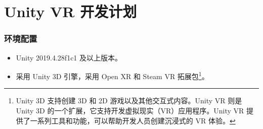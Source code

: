 \documentclass[letterpaper,10pt]{article}
\begin{document}
%				
%				
%				
%				
%				
%				
	
	\part{Unity VR 开发计划}
	
		\section{环境配置}

		\begin{itemize}
			\item [(1)] 
			Unity 2019.4.28f1c1 及以上版本。
			
			\item [(2)]
			采用 Unity 3D 引擎，采用 Open XR 和 Steam VR 拓展包\footnote{Unity 3D 支持创建 3D 和 2D 游戏以及其他交互式内容。Unity VR 则是 Unity 3D 的一个扩展，它支持开发虚拟现实（VR）应用程序。Unity VR 提供了一系列工具和功能，可以帮助开发人员创建沉浸式的 VR 体验。}。
		\end{itemize}
\end{document}
